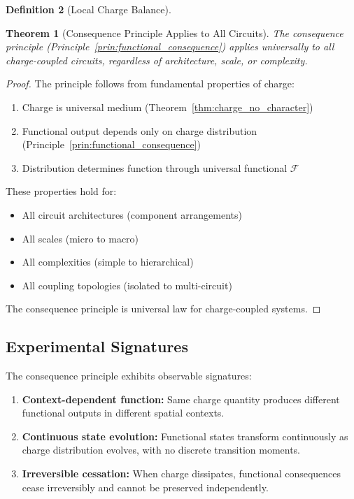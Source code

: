 \documentclass[12pt,a4paper]{article}
\theoremstyle{plain}
\newtheorem{theorem}{Theorem}[section]
\theoremstyle{definition}
\newtheorem{definition}[theorem]{Definition}
\theoremstyle{remark}
\begin{document}
\begin{definition}[Local Charge Balance]
\begin{theorem}[Consequence Principle Applies to All Circuits]
\label{thm:universal_consequence}
The consequence principle (Principle~\ref{prin:functional_consequence}) applies universally to all charge-coupled circuits, regardless of architecture, scale, or complexity.
\end{theorem}

\begin{proof}
The principle follows from fundamental properties of charge:
\begin{enumerate}
\item Charge is universal medium (Theorem~\ref{thm:charge_no_character})
\item Functional output depends only on charge distribution (Principle~\ref{prin:functional_consequence})
\item Distribution determines function through universal functional $\mathcal{F}$
\end{enumerate}

These properties hold for:
\begin{itemize}
\item All circuit architectures (component arrangements)
\item All scales (micro to macro)
\item All complexities (simple to hierarchical)
\item All coupling topologies (isolated to multi-circuit)
\end{itemize}

The consequence principle is universal law for charge-coupled systems.
\end{proof}

\subsection{Experimental Signatures}

The consequence principle exhibits observable signatures:

\begin{enumerate}
\item \textbf{Context-dependent function:} Same charge quantity produces different functional outputs in different spatial contexts.

\item \textbf{Continuous state evolution:} Functional states transform continuously as charge distribution evolves, with no discrete transition moments.

\item \textbf{Irreversible cessation:} When charge dissipates, functional consequences cease irreversibly and cannot be preserved independently.


\end{enumerate}
\end{definition}
\end{document}
